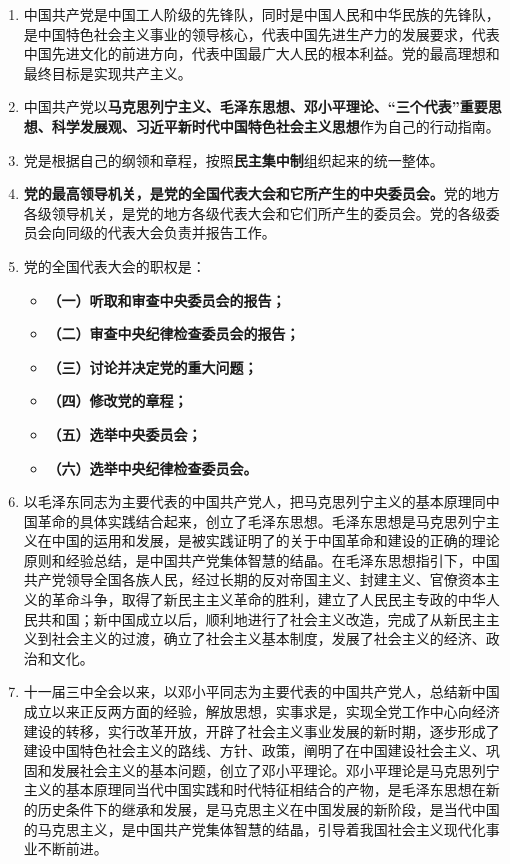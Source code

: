 \documentclass[UTF8,11pt,a4paper]{ctexart}
\begin{document}
\begin{enumerate}[label=\arabic*., leftmargin=2.3em]
\item 中国共产党是中国工人阶级的先锋队，同时是中国人民和中华民族的先锋队，是中国特色社会主义事业的领导核心，代表中国先进生产力的发展要求，代表中国先进文化的前进方向，代表中国最广大人民的根本利益。党的最高理想和最终目标是实现共产主义。
\item 中国共产党以\textbf{马克思列宁主义、毛泽东思想、邓小平理论、“三个代表”重要思想、科学发展观、习近平新时代中国特色社会主义思想}作为自己的行动指南。
\item 党是根据自己的纲领和章程，按照\textbf{民主集中制}组织起来的统一整体。
\item \textbf{党的最高领导机关，是党的全国代表大会和它所产生的中央委员会。}党的地方各级领导机关，是党的地方各级代表大会和它们所产生的委员会。党的各级委员会向同级的代表大会负责并报告工作。
\item 党的全国代表大会的职权是：
\begin{itemize}[leftmargin=2.2em,label={}]
\item \textbf{（一）听取和审查中央委员会的报告；}
\item \textbf{（二）审查中央纪律检查委员会的报告；}
\item \textbf{（三）讨论并决定党的重大问题；}
\item \textbf{（四）修改党的章程；}
\item \textbf{（五）选举中央委员会；}
\item \textbf{（六）选举中央纪律检查委员会。}
\end{itemize}
\item 以毛泽东同志为主要代表的中国共产党人，把马克思列宁主义的基本原理同中国革命的具体实践结合起来，创立了毛泽东思想。毛泽东思想是马克思列宁主义在中国的运用和发展，是被实践证明了的关于中国革命和建设的正确的理论原则和经验总结，是中国共产党集体智慧的结晶。在毛泽东思想指引下，中国共产党领导全国各族人民，经过长期的反对帝国主义、封建主义、官僚资本主义的革命斗争，取得了新民主主义革命的胜利，建立了人民民主专政的中华人民共和国；新中国成立以后，顺利地进行了社会主义改造，完成了从新民主主义到社会主义的过渡，确立了社会主义基本制度，发展了社会主义的经济、政治和文化。
\item 十一届三中全会以来，以邓小平同志为主要代表的中国共产党人，总结新中国成立以来正反两方面的经验，解放思想，实事求是，实现全党工作中心向经济建设的转移，实行改革开放，开辟了社会主义事业发展的新时期，逐步形成了建设中国特色社会主义的路线、方针、政策，阐明了在中国建设社会主义、巩固和发展社会主义的基本问题，创立了邓小平理论。邓小平理论是马克思列宁主义的基本原理同当代中国实践和时代特征相结合的产物，是毛泽东思想在新的历史条件下的继承和发展，是马克思主义在中国发展的新阶段，是当代中国的马克思主义，是中国共产党集体智慧的结晶，引导着我国社会主义现代化事业不断前进。

\end{enumerate}
\end{document}
